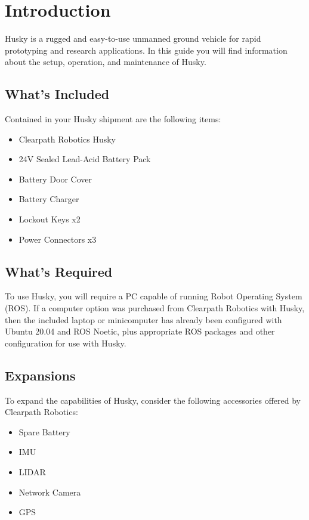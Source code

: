 \documentclass[]{clearpath-latex/clearpath-manual}
\begin{document}
\tableofcontents

\section{Introduction}

Husky is a rugged and easy-to-use unmanned ground vehicle for rapid prototyping and research applications. In this guide you will find information about the setup, operation, and maintenance of Husky.

\subsection{What's Included}

Contained in your Husky shipment are the following items:

\begin{itemize}[nolistsep]
  \item Clearpath Robotics Husky
  \item 24V Sealed Lead-Acid Battery Pack
  \item Battery Door Cover
  \item Battery Charger
  \item Lockout Keys x2
  \item Power Connectors x3
\end{itemize}


\subsection{What's Required}

To use Husky, you will require a PC capable of running Robot Operating System (ROS).
If a computer option was purchased from Clearpath Robotics with Husky, then the included laptop or minicomputer has
already been configured with Ubuntu 20.04 and ROS Noetic, plus appropriate ROS packages and other configuration for use with Husky.

\subsection{Expansions}
To expand the capabilities of Husky, consider the following accessories offered by Clearpath Robotics:


\begin{itemize}[nolistsep]
  \item Spare Battery
  \item IMU
  \item LIDAR
  \item Network Camera
  \item GPS
\end{itemize}
\end{document}
